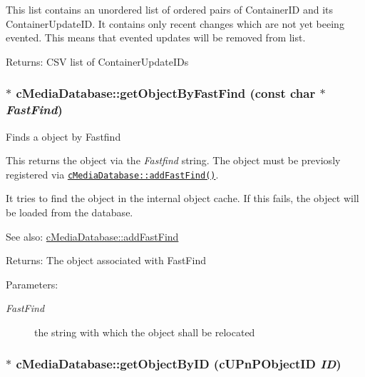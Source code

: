 This list contains an unordered list of ordered pairs of ContainerID and its ContainerUpdateID. It contains only recent changes which are not yet beeing evented. This means that evented updates will be removed from list.

\begin{Desc}
\item[Returns:]CSV list of ContainerUpdateIDs \end{Desc}
\hypertarget{classcMediaDatabase_b0fac893d82c29276d68b94569cfef1d}{
\subsubsection[{getObjectByFastFind}]{ $\ast$ cMediaDatabase::getObjectByFastFind (const char $\ast$ {\em FastFind})}}
\label{classcMediaDatabase_b0fac893d82c29276d68b94569cfef1d}


Finds a object by Fastfind

This returns the object via the {\em Fastfind\/} string. The object must be previosly registered via {\tt \hyperlink{classcMediaDatabase_1aec38e63143c7eb26012f1c74fe373d}{cMediaDatabase::addFastFind()}}.

It tries to find the object in the internal object cache. If this fails, the object will be loaded from the database.

\begin{Desc}
\item[See also:]\hyperlink{classcMediaDatabase_1aec38e63143c7eb26012f1c74fe373d}{cMediaDatabase::addFastFind} \end{Desc}
\begin{Desc}
\item[Returns:]The object associated with FastFind \end{Desc}
\begin{Desc}
\item[Parameters:]
\begin{description}
\item[{\em FastFind}]the string with which the object shall be relocated \end{description}
\end{Desc}
\hypertarget{classcMediaDatabase_b8da7da9612c64de0ddf88db3c316d5a}{
\subsubsection[{getObjectByID}]{ $\ast$ cMediaDatabase::getObjectByID ({\bf cUPnPObjectID} {\em ID})}}
\label{classcMediaDatabase_b8da7da9612c64de0ddf88db3c316d5a}


